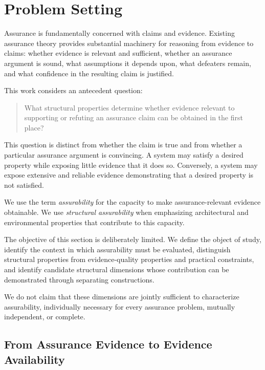 
\section{Problem Setting}
\label{aa.sec.foundations}

Assurance is fundamentally concerned with claims and evidence.
Existing assurance theory provides substantial machinery for reasoning
from evidence to claims: whether evidence is relevant and sufficient,
whether an assurance argument is sound, what assumptions it depends upon,
what defeaters remain, and what confidence in the resulting claim is justified.

This work considers an antecedent question:

\begin{quote}
  What structural properties determine whether evidence relevant to
  supporting or refuting an assurance claim can be obtained in the first place?
\end{quote}

This question is distinct from whether the claim is true and from whether
a particular assurance argument is convincing.
A system may satisfy a desired property while exposing little evidence
that it does so.
Conversely, a system may expose extensive and reliable evidence
demonstrating that a desired property is not satisfied.

We use the term \emph{assurability} for the capacity to make
assurance-relevant evidence obtainable.
We use \emph{structural assurability} when emphasizing architectural
and environmental properties that contribute to this capacity.

The objective of this section is deliberately limited.
We define the object of study, identify the context in which assurability
must be evaluated, distinguish structural properties from evidence-quality
properties and practical constraints, and identify candidate structural
dimensions whose contribution can be demonstrated through separating
constructions.

We do not claim that these dimensions are jointly sufficient to
characterize assurability, individually necessary for every assurance
problem, mutually independent, or complete.

\subsection{From Assurance Evidence to Evidence Availability}
\label{aa.subsec.evidence-availability}

